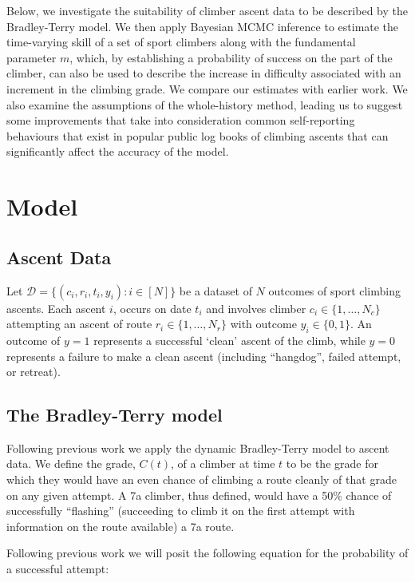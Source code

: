 \documentclass[ba]{imsart}
\begin{document}
Below, we investigate the suitability of climber ascent data to be described by the Bradley-Terry model.  We then apply Bayesian MCMC inference to estimate the time-varying skill of a set of sport climbers along with the fundamental parameter $m$, which, by establishing a probability of success on the part of the climber, can also be used to describe the increase in difficulty associated with an increment in the climbing grade.  We compare our estimates with earlier work.  We also examine the assumptions of the whole-history method, leading us to suggest some improvements that take into consideration common self-reporting behaviours that exist in popular public log books of climbing ascents that can significantly affect the accuracy of the model.

\section{Model}

\subsection{Ascent Data}

Let $\mathcal{D} = \{(c_i, r_i, t_i, y_i) : i \in [N]\}$ be a dataset of $N$ outcomes of sport climbing ascents.  Each ascent $i$, occurs on date $t_i$ and involves climber $c_i \in \{1,\dots, N_c\}$ attempting an ascent of route $r_i \in \{1,\dots, N_r\}$ with outcome $y_i \in \{0,1\}$. An outcome of $y=1$ represents a successful `clean' ascent of the climb, while $y=0$ represents a failure to make a clean ascent (including ``\gls{hangdog}'', failed attempt, or retreat).

\subsection{The Bradley-Terry model}

Following previous work  \citep{scarff2020estimation} we apply the dynamic Bradley-Terry model \citep{zermelo1929berechnung,bradley1952rank} to ascent data. We define the grade, $C(t)$, of a climber at time $t$ to be the grade for which they would have an even chance of climbing a route cleanly of that grade on any given attempt. A 7a climber, thus defined, would have a 50\% chance of successfully ``flashing'' (succeeding to climb it on the first attempt with information on the route available) a 7a route.

Following previous work \citep{scarff2020estimation} we will posit the following equation for the probability of a successful attempt:
\end{document}
